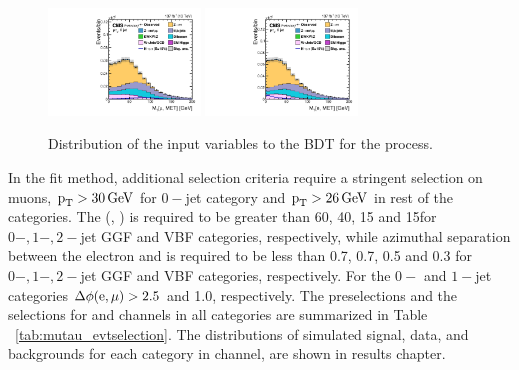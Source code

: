 \begin{figure}[htbp!]
  \includegraphics[width=0.36\textwidth]{plots/chapter6/mue/MTMuMET.pdf}
  \includegraphics[width=0.36\textwidth]{plots/chapter6/mue/MTEMET.pdf}\\
  \caption{Distribution of the input variables to the BDT for the \Hmue process.}
  \label{fig:input_me}
\end{figure}

In the \mcol fit method, additional selection criteria require a stringent selection on muons, $\text{p}_\text{T} > 30\,\text{Ge\hspace{-.08em}V}$ for $0-$jet category and $\text{p}_\text{T} > 26\,\text{Ge\hspace{-.08em}V}$ in rest of the categories. The \mt(\Pgm, \ptvecmiss) is required to be greater than 60, 40, 15 and 15\GeV for $0-, 1-, 2-$jet GGF and VBF categories, respectively, while azimuthal separation between the electron and \ptvecmiss is required to be less than 0.7, 0.7, 0.5 and 0.3 for $0-, 1-, 2-$jet GGF and VBF categories, respectively. For the $0-$ and $1-$jet categories $\Delta\phi(\text{e},\mu) > 2.5$ and 1.0, respectively. The preselections and the selections for \Hmuhad and \Hmue channels in all categories are summarized in Table ~\ref{tab:mutau_evtselection}. The \mcol distributions of simulated signal, data, and backgrounds for each category in \Hmue channel, are shown in results chapter.

